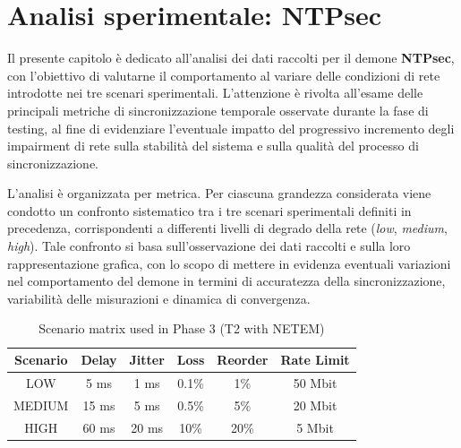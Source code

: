 \chapter{Analisi sperimentale: NTPsec}
\label{cha:NTPsec} \label{cha:NTPsec}

Il presente capitolo è dedicato all’analisi dei dati raccolti per il demone
\textbf{NTPsec}, con l’obiettivo di valutarne il comportamento al variare delle
condizioni di rete introdotte nei tre scenari sperimentali. L’attenzione è rivolta
all’esame delle principali metriche di sincronizzazione temporale osservate durante
la fase di testing, al fine di evidenziare l’eventuale impatto del progressivo
incremento degli impairment di rete sulla stabilità del sistema e sulla qualità
del processo di sincronizzazione.

L’analisi è organizzata per metrica. Per ciascuna grandezza considerata viene condotto
un confronto sistematico tra i tre scenari sperimentali definiti in precedenza,
corrispondenti a differenti livelli di degrado della rete (\textit{low}, \textit{medium},
\textit{high}). Tale confronto si basa sull’osservazione dei dati raccolti e
sulla loro rappresentazione grafica, con lo scopo di mettere in evidenza eventuali
variazioni nel comportamento del demone in termini di accuratezza della sincronizzazione,
variabilità delle misurazioni e dinamica di convergenza.

\vspace{0,2 cm}
\begin{table}[h]
  \centering
  \caption{Scenario matrix used in Phase 3 (T2 with NETEM)}
  \begin{tabular}{|c|c|c|c|c|c|}
    \hline
    \textbf{Scenario} & \textbf{Delay} & \textbf{Jitter} & \textbf{Loss} & \textbf{Reorder} & \textbf{Rate Limit} \\
    \hline
    LOW               & 5 ms           & 1 ms            & 0.1\%         & 1\%              & 50 Mbit             \\
    \hline
    MEDIUM            & 15 ms          & 5 ms            & 0.5\%         & 5\%              & 20 Mbit             \\
    \hline
    HIGH              & 60 ms          & 20 ms           & 10\%          & 20\%             & 5 Mbit              \\
    \hline
  \end{tabular}
  \label{tab:scenario_matrix}
\end{table}
\vspace{0,4 cm}

